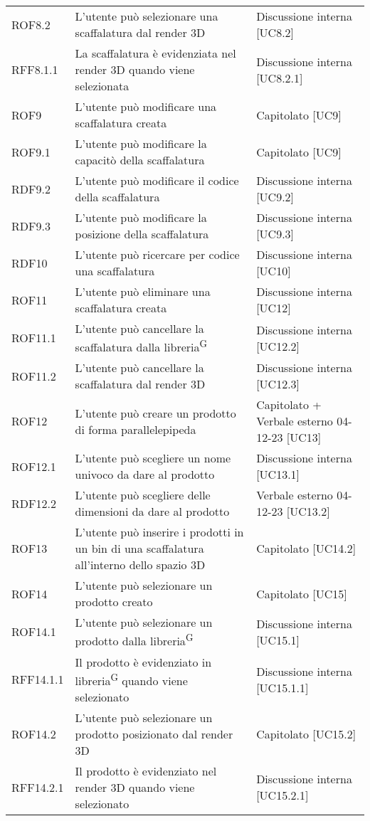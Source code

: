 \begin{xltabular}{\textwidth}{ p{0.2\textwidth} | X | p{0.2\textwidth} }
    ROF8.2& L'utente può selezionare una scaffalatura dal render 3D & Discussione interna [UC8.2]\\
    RFF8.1.1& La scaffalatura è evidenziata nel render 3D quando viene selezionata & Discussione interna [UC8.2.1]\\
    ROF9& L'utente può modificare una scaffalatura creata & Capitolato [UC9]\\
    ROF9.1& L'utente può modificare la capacitò della scaffalatura & Capitolato [UC9]\\
    RDF9.2& L'utente può modificare il codice della scaffalatura & Discussione interna [UC9.2]\\
    RDF9.3& L'utente può modificare la posizione della scaffalatura & Discussione interna [UC9.3]\\
    RDF10& L'utente può ricercare per codice una scaffalatura & Discussione interna [UC10]\\
    ROF11& L'utente può eliminare una scaffalatura creata & Discussione interna [UC12]\\
    ROF11.1& L'utente può cancellare la scaffalatura dalla libreria\textsuperscript{G} & Discussione interna [UC12.2]\\
    ROF11.2& L'utente può cancellare la scaffalatura dal render 3D & Discussione interna [UC12.3]\\
    ROF12& L'utente può creare un prodotto di forma parallelepipeda & Capitolato + Verbale esterno 04-12-23 [UC13]\\
    ROF12.1& L'utente può scegliere un nome univoco da dare al prodotto & Discussione interna [UC13.1]\\
    RDF12.2& L'utente può scegliere delle dimensioni da dare al prodotto & Verbale esterno 04-12-23 [UC13.2]    \\
    ROF13& L'utente può inserire i prodotti in un bin di una scaffalatura all'interno dello spazio 3D & Capitolato [UC14.2]\\
    ROF14& L'utente può selezionare un prodotto creato & Capitolato [UC15]\\
    ROF14.1& L'utente può selezionare un prodotto dalla libreria\textsuperscript{G} & Discussione interna [UC15.1]\\
    RFF14.1.1& Il prodotto è evidenziato in libreria\textsuperscript{G} quando viene selezionato & Discussione interna [UC15.1.1]\\
    ROF14.2& L'utente può selezionare un prodotto posizionato dal render 3D & Capitolato [UC15.2]\\
    RFF14.2.1& Il prodotto è evidenziato nel render 3D quando viene selezionato & Discussione interna [UC15.2.1]\\

\end{xltabular}
